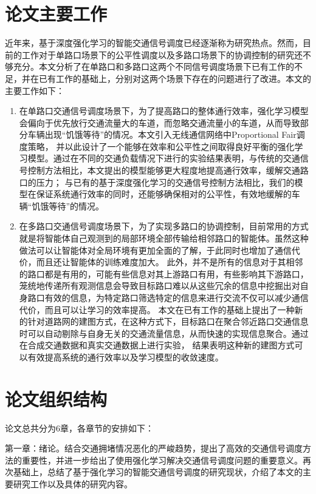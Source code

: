 \section{论文主要工作}
近年来，基于深度强化学习的智能交通信号调度已经逐渐称为研究热点。然而，目前的工作对于单路口场景下的公平性调度以及多路口场景下的协调控制的研究还不够充分。本文分析了在单路口和多路口这两个不同信号调度场景下已有工作的不足，并在已有工作的基础上，分别对这两个场景下存在的问题进行了改进。本文的主要工作如下：
\begin{enumerate}
    \item 在单路口交通信号调度场景下，为了提高路口的整体通行效率，强化学习模型会偏向于优先放行交通流量大的车道，而忽略交通流量小的车道，从而导致部分车辆出现“饥饿等待”的情况。本文引入无线通信网络中Proportional Fair调度策略，
    并以此设计了一个能够在效率和公平性之间取得良好平衡的强化学习模型。通过在不同的交通负载情况下进行的实验结果表明，与传统的交通信号控制方法相比，本文提出的模型能够更大程度地提高通行效率，缓解交通路口的压力；
    与已有的基于深度强化学习的交通信号控制方法相比，我们的模型在保证系统通行效率的同时，还能够确保相对的公平性，有效地缓解的车辆“饥饿等待”的情况。
    \item 在多路口交通信号调度场景下，为了实现多路口的协调控制，目前常用的方式就是将智能体自己观测到的局部环境全部传输给相邻路口的智能体。虽然这种做法可以让智能体对全局环境有更加全面的了解，于此同时也增加了通信代价，而且还让智能体的训练难度加大。
    此外，并不是所有的信息对于其相邻的路口都是有用的，可能有些信息对其上游路口有用，有些影响其下游路口，笼统地传递所有观测信息会导致目标路口难以从这些冗余的信息中挖掘出对自身路口有效的信息，为特定路口筛选特定的信息来进行交流不仅可以减少通信代价，而且可以让学习的效率提高。
    本文在已有工作的基础上提出了一种新的针对道路网的建图方式，在这种方式下，目标路口在聚合邻近路口交通信息时可以自动剔除与自身无关的交通流量信息，从而快速的实现信息聚合。通过在合成交通数据和真实交通数据上进行实验，
    结果表明这种新的建图方式可以有效提高系统的通行效率以及学习模型的收敛速度。
\end{enumerate}
\section{论文组织结构}
论文总共分为6章，各章节的安排如下：

第一章：绪论。结合交通拥堵情况恶化的严峻趋势，提出了高效的交通信号调度方法的重要性，并进一步给出了使用强化学习解决交通信号调度问题的重要意义。再次基础上，总结了基于强化学习的智能交通信号调度的研究现状，介绍了本文的主要研究工作以及具体的研究内容。

